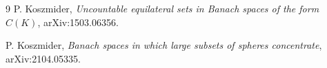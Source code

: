 \documentclass[11pt]{article}
\begin{document}
\begin{thebibliography}{9}
P. Koszmider,
\emph{Uncountable equilateral sets in Banach spaces of the form $C(K)$},
arXiv:1503.06356.

P. Koszmider,
\emph{Banach spaces in which large subsets of spheres concentrate},
arXiv:2104.05335.
\end{thebibliography}
\end{document}
